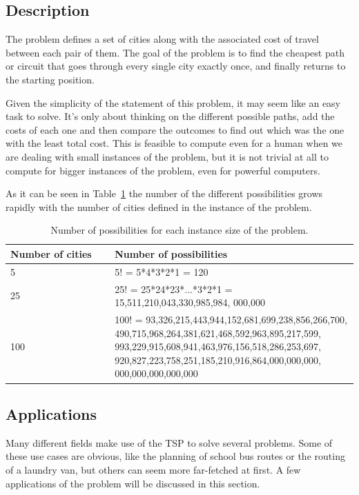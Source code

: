 \documentclass[runningheads]{llncs}
\begin{document}
\subsection{Description}
The problem defines a set of cities along with the associated cost of travel between each pair of them. The goal of the problem is to find the cheapest path or circuit that goes through every single city exactly once, and finally returns to the starting position.

Given the simplicity of the statement of this problem, it may seem like an easy task to solve. It's only about thinking on the different possible paths, add the costs of each one and then compare the outcomes to find out which was the one with the least total cost. This is feasible to compute even for a human when we are dealing with small instances of the problem, but it is not trivial at all to compute for bigger instances of the problem, even for powerful computers.

As it can be seen in Table~\ref{tab1} the number of the different possibilities grows rapidly with the number of cities defined in the instance of the problem.

\begin{table}
\caption{Number of possibilities for each instance size of the problem.}\label{tab1}
\begin{tabular}{ |p{0.3\linewidth}|p{0.7\linewidth}| }
\hline
Number of cities &  Number of possibilities \\
\hline
5 &  5! = 5*4*3*2*1 = 120\\
25 & 25! = 25*24*23*...*3*2*1 = 15,511,210,043,330,985,984, 000,000 \\
100 & 100!  = 93,326,215,443,944,152,681,699,238,856,266,700, 490,715,968,264,381,621,468,592,963,895,217,599, 993,229,915,608,941,463,976,156,518,286,253,697, 920,827,223,758,251,185,210,916,864,000,000,000, 000,000,000,000,000 \\
\hline
\end{tabular}
\end{table}

\subsection{Applications}
Many different fields make use of the TSP to solve several problems. Some of these use cases are obvious, like the planning of school bus routes or the routing of a laundry van, but others can seem more far-fetched at first.
A few applications of the problem will be discussed in this section.
\end{document}
